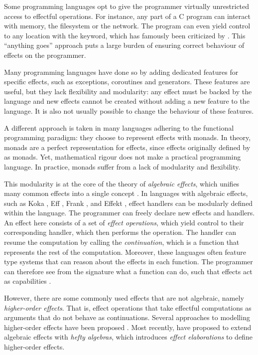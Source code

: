 Some programming languages opt to give the programmer virtually unrestricted access to effectful operations. For instance, any part of a C program can interact with memory, the filesystem or the network. The program can even yield control to any location with the  keyword, which has famously been criticized by \textcite{dijkstra_letters_1968}. This ``anything goes'' approach puts a large burden of ensuring correct behaviour of effects on the programmer.

Many programming languages have done so by adding dedicated features for specific effects, such as exceptions, coroutines and generators. These features are useful, but they lack flexibility and modularity: any effect must be backed by the language and new effects cannot be created without adding a new feature to the language. It is also not usually possible to change the behaviour of these features.

A different approach is taken in many languages adhering to the functional programming paradigm: they choose to represent effects with monads. In theory, monads are a perfect representation for effects, since effects originally defined by \textcite{moggi_notions_1991} as monads. Yet, mathematical rigour does not make a practical programming language. In practice, monads suffer from a lack of modularity and flexibility.\citationneeded

This modularity is at the core of the theory of \emph{algebraic effects}, which unifies many common effects into a single concept \autocite{goos_adequacy_2001,castagna_handlers_2009}. In languages with algebraic effects, such as Koka \autocite{leijen_koka_2014}, Eff \autocite{bauer_programming_2015}, Frank \autocite{lindley_be_2017}, and Effekt \autocite{brachthauser_effects_2020}, effect handlers can be modularly defined within the language. The programmer can freely declare new effects and handlers. An effect here consists of a set of \emph{effect operations}, which yield control to their corresponding handler, which then performs the operation. The handler can resume the computation by calling the \emph{continuation}, which is a function that represents the rest of the computation. Moreover, these languages often feature type systems that can reason about the effects in each function. The programmer can therefore see from the signature what a function can do, such that effects act as capabilities \autocite{brachthauser_effects_2020}.

However, there are some commonly used effects that are not algebraic, namely \emph{higher-order effects}. That is, effect operations that take effectful computations as arguments that do not behave as continuations. Several approaches to modelling higher-order effects have been proposed \autocite{wu_effect_2014,oh_latent_2021}. Most recently, \textcite{bach_poulsen_hefty_2023} have proposed to extend algebraic effects with \emph{hefty algebras}, which introduces \emph{effect elaborations} to define higher-order effects. 

